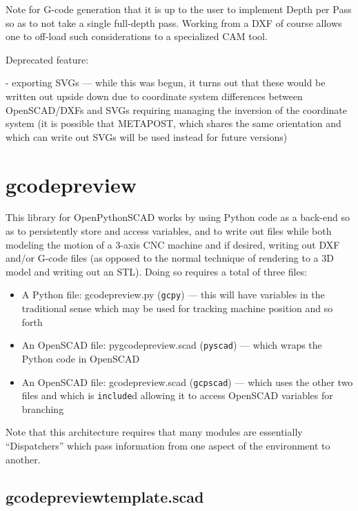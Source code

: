 \documentclass{ltxdoc}
\begin{document}
\begin{readme}
Note for G-code generation that it is up to the user 
to implement Depth per Pass so as to not take a 
single full-depth pass. Working from a DXF of course 
allows one to off-load such considerations to a 
specialized CAM tool.

Deprecated feature:

 - exporting SVGs --- while this was begun, it turns out that these would be written out upside down due to coordinate system differences between OpenSCAD/DXFs and SVGs requiring managing the inversion of the coordinate system (it is possible that METAPOST, which shares the same orientation and which can write out SVGs will be used instead for future versions)

\end{readme}

\clearpage
\section{gcodepreview}

This library for OpenPythonSCAD works by using Python code as a back-end so as to persistently store 
and access variables, and to write out files while both modeling the motion of a 3-axis CNC machine
and if desired, writing out DXF and/or G-code files (as opposed to the normal technique of 
rendering to a 3D model and writing out an STL). Doing so requires a total of three files:

\begin{itemize}
\item A Python file: gcodepreview.py (\texttt{gcpy}) --- this will have variables in the 
      traditional sense which may be used for tracking machine position and so forth
\item An OpenSCAD file: pygcodepreview.scad (\texttt{pyscad}) --- which wraps the Python code 
      in OpenSCAD
\item An OpenSCAD file: gcodepreview.scad (\texttt{gcpscad}) --- which uses the other two files 
      and which is \texttt{include}d allowing it to access OpenSCAD variables for branching   
\end{itemize}

Note that this architecture requires that many modules are essentially ``Dispatchers'' which 
pass information from one aspect of the environment to another.

\subsection{gcodepreviewtemplate.scad}
\end{document}
